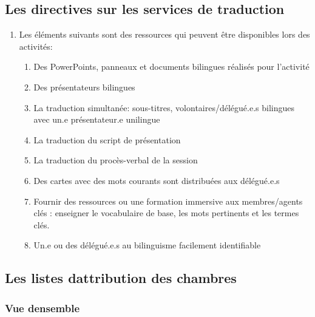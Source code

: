 \subsection{Les directives sur les services de traduction}
\label{les-directives-sur-les-services-de-traduction}

\begin{enumerate}
 \item
  Les éléments suivants sont des ressources qui peuvent être disponibles lors des activités:

  \begin{enumerate}
   \item
    Des PowerPoints, panneaux et documents bilingues réalisés pour l'activité
   \item
    Des présentateurs bilingues
   \item
    La traduction simultanée: sous-titres, volontaires/délégué.e.s bilingues avec un.e présentateur.e unilingue
   \item
    La traduction du script de présentation
   \item
    La traduction du procès-verbal de la session
   \item
    Des cartes avec des mots courants sont distribuées aux délégué.e.s
   \item
    Fournir des ressources ou une formation immersive aux membres/agents clés : enseigner le vocabulaire de base, les mots pertinents et les termes clés.
   \item
    Un.e ou des délégué.e.s au bilinguisme facilement identifiable
  \end{enumerate}
\end{enumerate}

\subsection{Les listes d\textquotesingle attribution des chambres}
\label{listes-attribution-chambres}

\subsubsection{Vue d\textquotesingle ensemble}
\label{listes-attribution-chambres-vue-densemble}

